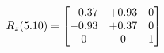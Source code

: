 \documentclass[preview]{standalone}
\begin{document}
\begin{align*}
\special{dvisvgm:raw <g id='unique000'>}R_{z}(5.10) = \begin{bmatrix}+0.37 & +0.93 & 0 \\-0.93 & +0.37 & 0 \\0 & 0 & 1\end{bmatrix}\special{dvisvgm:raw </g>}
\end{align*}
\end{document}
